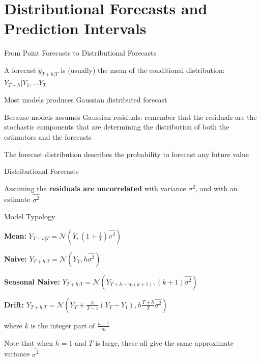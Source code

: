 \documentclass{beamer}
\newenvironment{wideitemize}{\itemize\addtolength{\itemsep}{10pt}}{\enditemize}
\begin{document}
\section{Distributional Forecasts and Prediction Intervals}
\begin{frame}{From Point Forecasts to Distributional Forecasts}

  \begin{wideitemize}
    \item A forecast $\hat{y}_{T+h|T}$ is (usually) the mean of the conditional distribution: $Y_{T+h} | Y_1, \dots Y_T$
    \item Most models produces Gaussian distributed forecast
    \item Because models assumes Gaussian residuals: remember that the residuals are the stochastic components that are determining the distribution of both the estimators and the forecasts
    \item The forecast distribution describes the probability to forecast any future value
  \end{wideitemize}

    
\end{frame}


\begin{frame}{Distributional Forecasts}

  Assuming the \textbf{residuals are uncorrelated} with variance $\sigma^2$, and with an estimate $\hat{\sigma^2}$

  \begin{alertblock}{Model Typology}
    \begin{wideitemize}
      \item \textbf{Mean:} $Y_{T+h|T} = \mathcal{N}(\overline{Y}, (1+\frac{1}{T})\hat{\sigma^2})$
      \item \textbf{Naive:} $Y_{T+h|T} = \mathcal{N}(Y_T, h\hat{\sigma^2})$
      \item \textbf{Seasonal Naive:} $Y_{T+h|T} = \mathcal{N}(Y_{T+h-m(k+1)}, (k+1)\hat{\sigma^2})$
      \item \textbf{Drift:} $Y_{T+h|T} = \mathcal{N}(Y_{T} +\frac{h}{T-1}(Y_T - Y_1), h\frac{T+h}{T}\hat{\sigma^2})$
    \end{wideitemize}
  \end{alertblock}

\medskip

\begin{wideitemize}
  \item where $k$ is the integer part of $\frac{h-1}{m}$
  \item Note that when $h=1$ and $T$ is large, these all give the same approximate variance $\hat{\sigma^2}$
\end{wideitemize}

\end{frame}
\end{document}
